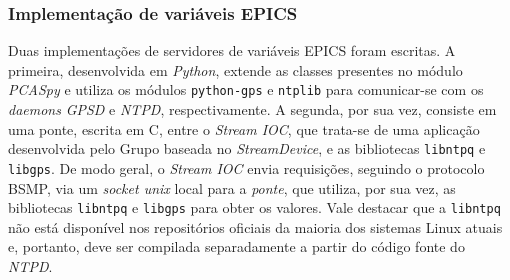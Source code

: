% 
% 
% 

\subsubsection{Implementação de variáveis EPICS}
\label{sec:pvsgps}

Duas implementações de servidores de variáveis EPICS foram escritas. A primeira,
desenvolvida em \textit{Python}, extende as classes presentes no módulo
\textit{PCASpy} e utiliza os módulos \texttt{python-gps} e \texttt{ntplib} para
comunicar-se com os \textit{daemons} \textit{GPSD} e \textit{NTPD},
respectivamente. A segunda, por sua vez, consiste em uma ponte, escrita em C,
entre o \textit{Stream IOC}, que trata-se de uma aplicação desenvolvida pelo
Grupo baseada no \textit{StreamDevice}, e as bibliotecas \texttt{libntpq} e
\texttt{libgps}.
De modo geral, o \textit{Stream IOC} envia requisições, seguindo o protocolo
BSMP, via um \textit{socket unix} local para a \textit{ponte}, que utiliza, por
sua vez, as bibliotecas \texttt{libntpq} e \texttt{libgps} para obter os valores. Vale
destacar que a \texttt{libntpq} não está disponível nos repositórios oficiais da
maioria dos sistemas Linux atuais e, portanto, deve ser compilada separadamente
a partir do código fonte do \textit{NTPD}.

